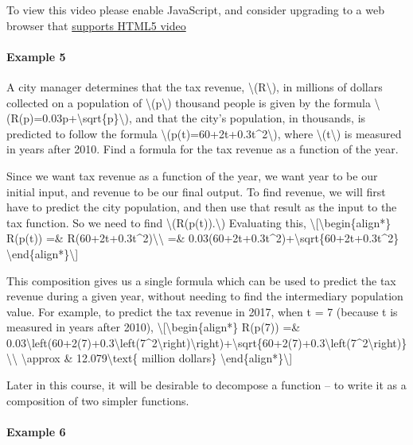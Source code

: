 To view this video please enable JavaScript, and consider upgrading to a
web browser that \href{http://videojs.com/html5-video-support/}{supports
HTML5 video}

\hypertarget{example-5}{%
\paragraph{Example 5}\label{example-5}}

A city manager determines that the tax revenue,
\textbackslash{}(R\textbackslash{}), in millions of dollars collected on
a population of \textbackslash{}(p\textbackslash{}) thousand people is
given by the formula
\textbackslash{}(R(p)=0.03p+\textbackslash{}sqrt\{p\}\textbackslash{}),
and that the city's population, in thousands, is predicted to follow the
formula \textbackslash{}(p(t)=60+2t+0.3t\^{}2\textbackslash{}), where
\textbackslash{}(t\textbackslash{}) is measured in years after 2010.
Find a formula for the tax revenue as a function of the year.

Since we want tax revenue as a function of the year, we want year to be
our initial input, and revenue to be our final output. To find revenue,
we will first have to predict the city population, and then use that
result as the input to the tax function. So we need to find
\textbackslash{}(R(p(t)).\textbackslash{}) Evaluating this,
\textbackslash{}{[}\textbackslash{}begin\{align*\} R(p(t)) =\&
R(60+2t+0.3t\^{}2)\textbackslash{}\textbackslash{} =\&
0.03(60+2t+0.3t\^{}2)+\textbackslash{}sqrt\{60+2t+0.3t\^{}2\}
\textbackslash{}end\{align*\}\textbackslash{}{]}

This composition gives us a single formula which can be used to predict
the tax revenue during a given year, without needing to find the
intermediary population value. For example, to predict the tax revenue
in 2017, when t = 7 (because t is measured in years after 2010),
\textbackslash{}{[}\textbackslash{}begin\{align*\} R(p(7)) =\&
0.03\textbackslash{}left(60+2(7)+0.3\textbackslash{}left(7\^{}2\textbackslash{}right)\textbackslash{}right)+\textbackslash{}sqrt\{60+2(7)+0.3\textbackslash{}left(7\^{}2\textbackslash{}right)\}\textbackslash{}\textbackslash{}
\textbackslash{}approx \& 12.079\textbackslash{}text\{ million dollars\}
\textbackslash{}end\{align*\}\textbackslash{}{]}

Later in this course, it will be desirable to decompose a function -- to
write it as a composition of two simpler functions.

\hypertarget{example-6}{%
\paragraph{Example 6}\label{example-6}}

